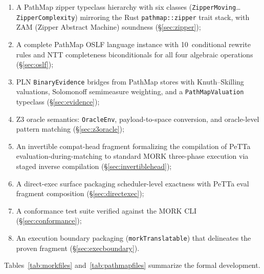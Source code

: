 \documentclass[11pt]{article}
\theoremstyle{definition}
\theoremstyle{remark}
\newcommand{\MORK}{\textup{MORK}}
\newcommand{\PathMap}{\textup{PathMap}}
\begin{document}
\begin{enumerate}[nosep]
        corresponds to \texttt{CommReduction} (\S\ref{sec:mqbridge});
  \item A \PathMap{} zipper typeclass hierarchy with six classes
        (\texttt{ZipperMoving}\ldots\texttt{ZipperComplexity}) mirroring
        the Rust \texttt{pathmap::zipper} trait stack, with ZAM
        (Zipper Abstract Machine) soundness (\S\ref{sec:zipper});
  \item A complete \PathMap{} OSLF language instance with 10~conditional
        rewrite rules and NTT completeness biconditionals for all four
        algebraic operations (\S\ref{sec:oslf});
  \item PLN \texttt{BinaryEvidence} bridges from \PathMap{} stores with
        Knuth--Skilling valuations, Solomonoff semimeasure weighting,
        and a \texttt{PathMapValuation} typeclass (\S\ref{sec:evidence});
  \item Z3 oracle semantics: \texttt{OracleEnv}, payload-to-space
        conversion, and oracle-level pattern matching (\S\ref{sec:z3oracle});
  \item An invertible compat-head fragment formalizing the compilation
        of PeTTa evaluation-during-matching to standard MORK three-phase
        execution via staged inverse compilation (\S\ref{sec:invertiblehead});
  \item A direct-exec surface packaging scheduler-level exactness with
        PeTTa eval fragment composition (\S\ref{sec:directexec});
  \item A conformance test suite verified against the \MORK{} CLI
        (\S\ref{sec:conformance});
  \item An execution boundary packaging (\texttt{morkTranslatable}) that
        delineates the proven fragment (\S\ref{sec:execboundary}).
\end{enumerate}

\noindent
Tables~\ref{tab:morkfiles} and~\ref{tab:pathmapfiles} summarize the
formal development.
\end{document}
